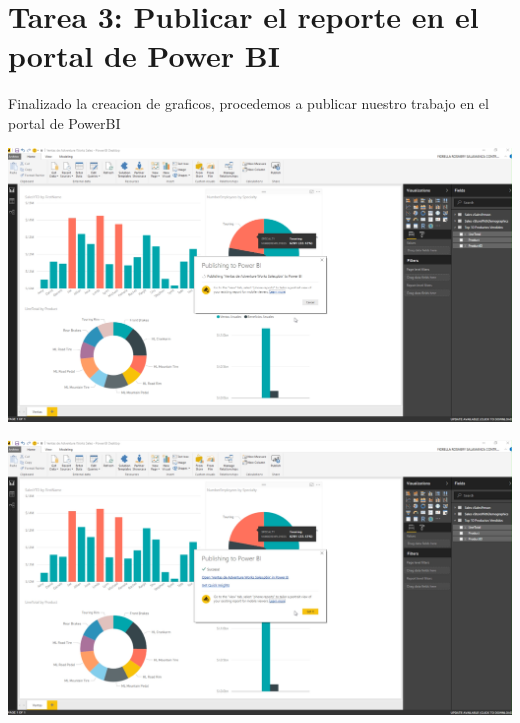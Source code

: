 \section{Tarea 3: Publicar el reporte en el portal de Power BI} 

Finalizado la creacion de graficos, procedemos a publicar nuestro trabajo en el portal de PowerBI

	\begin{center}
	\includegraphics[width=17cm]{./Imagenes/7}
	\end{center}	

	\begin{center}
	\includegraphics[width=17cm]{./Imagenes/8}
	\end{center}	